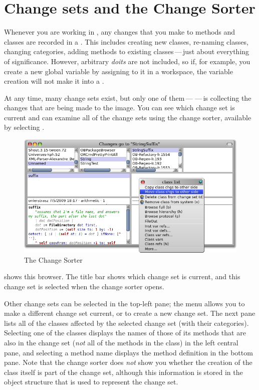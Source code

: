 \documentclass[a4paper,10pt,twoside]{book}
\begin{document}

\section{Change sets and the Change Sorter}

Whenever you are working in \pharo, any changes that you make to methods and classes are recorded in a .
This includes creating new classes, re-naming classes, changing categories, adding methods to existing classes\,---\,just about everything of significance.  
However, arbitrary \emph{doits} are not included, so if, for example, you create a new global variable by assigning to it in a workspace, the variable creation will not make it into a .

At any time, many change sets exist, but only one of them\,---\,\,---\,is collecting the changes that are being made to the image.  
You can see which change set is current and can examine all of the change sets using the  change sorter, available by selecting .

\begin{figure}[btp]
	\begin{center}
		\includegraphics[width=\linewidth]{changeSorter}
	\end{center}
	\caption{The Change Sorter}
\end{figure}

 shows this browser.  The title bar shows which change set is current, and this change set is selected when the change sorter opens. 

Other change sets can be selected in the top-left pane; the \actclick menu allows you to make a different change set current, or to create a new change set.
The next pane lists all of the classes affected by the selected change set (with their categories).
Selecting one of the classes displays the names of those of its methods that are also in the change set (\emph{not} all of the methods in the class) in the left central pane, and selecting a method name displays the method definition in the bottom pane.
Note that the change sorter does \emph{not} show you whether the creation of the class itself is part of the change set, although this information is stored in the object structure that is used to represent the change set.
\end{document}

